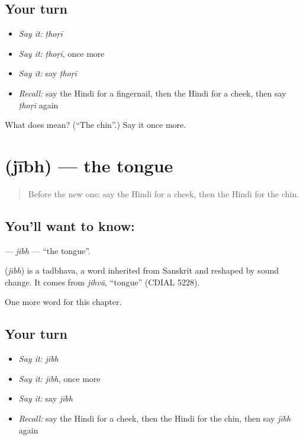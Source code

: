 \subsection*{Your turn}
\begin{itemize}
\raggedright
  \item \emph{Say it:} \emph{ṭhoṛī}
  \item \emph{Say it:} \emph{ṭhoṛī}, once more
  \item \emph{Say it:} say \emph{ṭhoṛī}
  \item \emph{Recall:} say the Hindi for a fingernail, then the Hindi for a cheek, then say \emph{ṭhoṛī} again
\end{itemize}

\begin{tcolorbox}[breakable,colback=teal!4,colframe=teal!35!black,title={Before you move on}]
What does  mean? (\textquotedblleft{}The chin\textquotedblright{}.) Say it once more.
\end{tcolorbox}
\section[\texorpdfstring{\hi{जीभ} (jībh)}{जीभ (jībh)}]{ (jībh) — the tongue}

\label{lesson:HI-C151-jibh}



\begin{quote}
Before the new one: say the Hindi for a cheek, then the Hindi for the chin.
\end{quote}

\subsection*{You'll want to know: }
\textbf{} — \emph{jībh} — \textquotedblleft{}the tongue\textquotedblright{}.

\begin{cousinweb}
\textbf{} (\emph{jībh}) is a tadbhava, a word inherited from Sanskrit and reshaped by sound change. It comes from \emph{jihvā}, \textquotedblleft{}tongue\textquotedblright{} (CDIAL 5228).
\end{cousinweb}

\begin{grammarlens}[title={What you've built}]
One more word for this chapter.
\end{grammarlens}

\subsection*{Your turn}
\begin{itemize}
\raggedright
  \item \emph{Say it:} \emph{jībh}
  \item \emph{Say it:} \emph{jībh}, once more
  \item \emph{Say it:} say \emph{jībh}
  \item \emph{Recall:} say the Hindi for a cheek, then the Hindi for the chin, then say \emph{jībh} again
\end{itemize}


